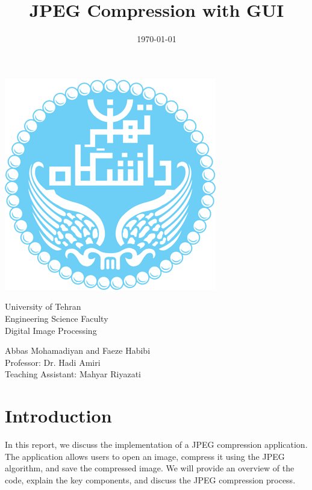 \documentclass[a4paper,12pt]{article}
\title{JPEG Compression with GUI}
\date{\today}
\begin{document}
\begin{titlepage}
  \centering
  \includegraphics[scale=0.4]{ut.png}
  \begin{center}
    \Large{University of Tehran \\ Engineering Science Faculty \\ }
    \vspace{2cm}
    \LARGE{Digital Image Processing\\}
    \vspace{2cm}

   \large{Abbas Mohamadiyan and Faeze Habibi\\}
   \vspace{1cm}
   \large{Professor: Dr. Hadi Amiri\\}
   \vspace{1cm}
   \large{Teaching Assistant: Mahyar Riyazati}

  \end{center}
 \maketitle
 \end{titlepage}

\section{Introduction}
In this report, we discuss the implementation of a JPEG compression application. The application allows users to open an image, compress it using the JPEG algorithm, and save the compressed image. We will provide an overview of the code, explain the key components, and discuss the JPEG compression process.
\end{document}
